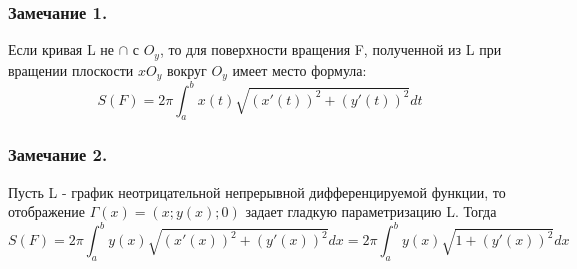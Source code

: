 \subsubsection{Замечание 1.}
Если кривая L не $\cap$ с $O_y$, то для поверхности вращения F, полученной из L при вращении плоскости $xO_y$ вокруг $O_y$ имеет место формула:
$$
S(F)=2\pi\int_{a}^{b}x(t)\sqrt{(x'(t))^2+(y'(t))^2}dt
$$

\subsubsection{Замечание 2.}
Пусть L - график неотрицательной непрерывной дифференцируемой функции, то отображение $\varGamma(x)=(x;y(x);0)$ задает гладкую параметризацию L. Тогда 
$$
S(F)=2\pi\int_{a}^{b}y(x)\sqrt{(x'(x))^2+(y'(x))^2}dx=2\pi\int_{a}^{b}y(x)\sqrt{1+(y'(x))^2}dx
$$